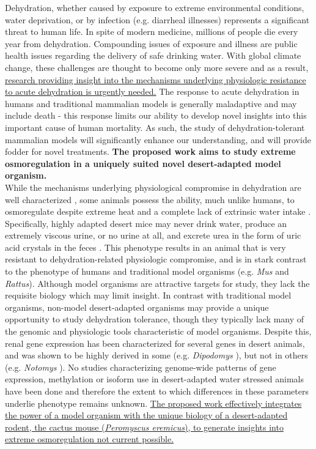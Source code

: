 \documentclass[11pt]{article}
\begin{document}
\noindent Dehydration, whether caused by exposure to extreme environmental conditions, water deprivation, or by infection (e.g. diarrheal illnesses) represents a significant threat to human life. In spite of modern medicine, millions of people die every year from dehydration. Compounding issues of exposure and illness are public health issues regarding the delivery of safe drinking water. With global climate change, these challenges are thought to become only more severe and as a result, \ul{research providing insight into the mechanisms underlying physiologic resistance to acute dehydration is urgently needed.} The response to acute dehydration in humans and traditional mammalian models is generally maladaptive and may include death - this response limits our ability to develop novel insights into this important cause of human mortality. As such, the study of dehydration-tolerant mammalian models will significantly enhance our understanding, and will provide fodder for novel treatments. \textbf{The proposed work aims to study extreme osmoregulation in a uniquely suited novel desert-adapted model organism.} \\

\noindent While the mechanisms underlying physiological compromise in dehydration are well characterized \citep{Roberts:2010fl}, some animals possess the ability, much unlike humans, to osmoregulate despite extreme heat and a complete lack of extrinsic water intake \citep{NAGY:1994ta}. Specifically, highly adapted desert mice may never drink water, produce an extremely viscous urine, or no urine at all, and excrete urea in the form of uric acid crystals in the feces \citep{SCHMIDTNIELSEN:1952wi}. This phenotype results in an animal that is very resistant to dehydration-related physiologic compromise, and is in stark contrast to the phenotype of humans and traditional model organisms (e.g. \textit{Mus} and \textit{Rattus}). Although model organisms are attractive targets for study, they lack the requisite biology which may limit insight. In contrast with traditional model organisms, non-model desert-adapted organisms may provide a unique opportunity to study dehydration tolerance, though they typically lack many of the genomic and physiologic tools characteristic of model organisms. Despite this, renal gene expression has been characterized for several genes in desert animals, and was shown to be highly derived in some (e.g. \textit{Dipodomys} \citep{Huang:2001ti}), but not in others (e.g. \textit{Notomys} \cite{Weaver:1994wv}). No studies characterizing genome-wide patterns of gene expression, methylation or isoform use in desert-adapted water stressed animals have been done and therefore the extent to which differences in these parameters underlie phenotype remains unknown. \ul{The proposed work effectively integrates the power of a model organism with the unique biology of a desert-adapted rodent, the cactus mouse (\textit{Peromyscus eremicus}), to generate insights into extreme osmoregulation not current possible.} \\
\end{document}
